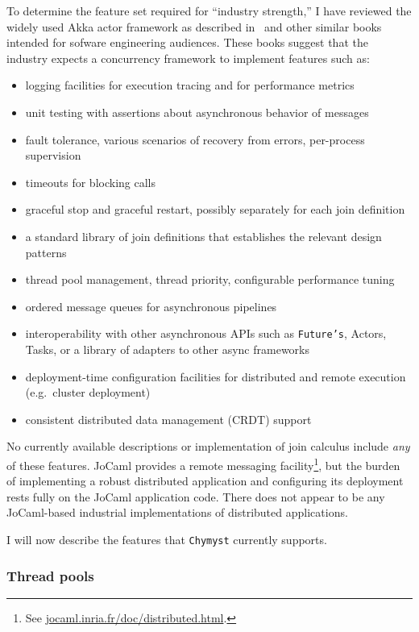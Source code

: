 \documentclass[sigplan,10pt,review,anonymous]{acmart}\settopmatter{printfolios=true}
\begin{document}
To determine the feature set required for ``industry strength,''
I have reviewed the widely used Akka actor framework as described
in~\citep{AIA2016} and other similar books intended for sofware
engineering audiences. These books suggest that the industry expects
a concurrency framework to implement features such as:
\begin{itemize}
\item logging facilities for execution tracing and for performance metrics 
\item unit testing with assertions about asynchronous behavior of messages 
\item fault tolerance, various scenarios of recovery from errors, per-process
supervision
\item timeouts for blocking calls
\item graceful stop and graceful restart, possibly separately for each join
definition 
\item a standard library of join definitions that establishes the relevant
design patterns
\item thread pool management, thread priority, configurable performance
tuning
\item ordered message queues for asynchronous pipelines
\item interoperability with other asynchronous APIs such as \texttt{Future's},
Actors, Tasks, or a library of adapters to other async frameworks
\item deployment-time configuration facilities for distributed and remote
execution (e.g.~cluster deployment)
\item consistent distributed data management (CRDT) support
\end{itemize}
No currently available descriptions or implementation of join calculus
include \emph{any} of these features. JoCaml provides a remote messaging
facility\footnote{ See \href{http://jocaml.inria.fr/doc/distributed.html}{jocaml.inria.fr/doc/distributed.html}.},
but the burden of implementing a robust distributed application and
configuring its deployment rests fully on the JoCaml application code.
There does not appear to be any JoCaml-based industrial implementations
of distributed applications.

I will now describe the features that \texttt{Chymyst} currently supports.

\subsubsection{Thread pools\label{subsec:Thread-pools}}
\end{document}
